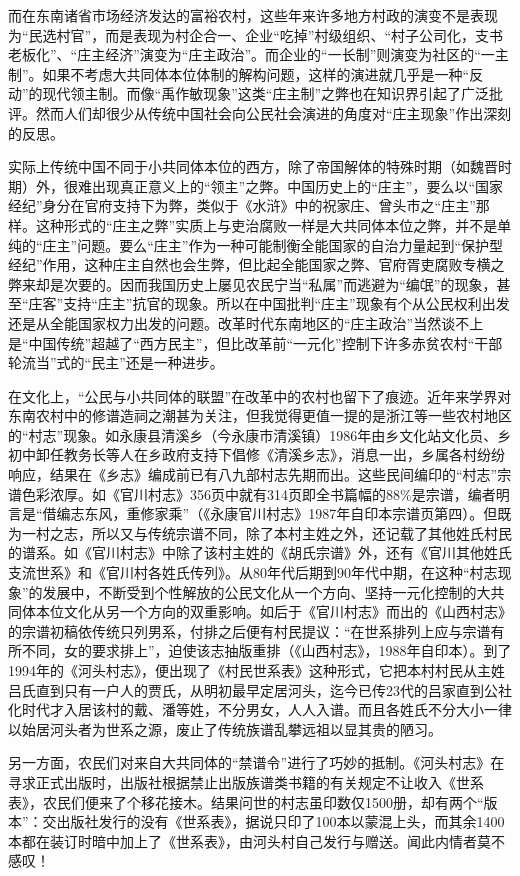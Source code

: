 \documentclass[a4paper,12pt,punct=kaiming,fontset=none]{ctexart}
\begin{document}
而在东南诸省市场经济发达的富裕农村，这些年来许多地方村政的演变不是表现为“民选村官”，而是表现为村企合一、企业“吃掉”村级组织、“村子公司化，支书老板化”、“庄主经济”演变为“庄主政治”。而企业的“一长制”则演变为社区的“一主制”。如果不考虑大共同体本位体制的解构问题，这样的演进就几乎是一种“反动”的现代领主制。而像“禹作敏现象”这类“庄主制”之弊也在知识界引起了广泛批评。然而人们却很少从传统中国社会向公民社会演进的角度对“庄主现象”作出深刻的反思。

实际上传统中国不同于小共同体本位的西方，除了帝国解体的特殊时期（如魏晋时期）外，很难出现真正意义上的“领主”之弊。中国历史上的“庄主”，要么以“国家经纪”身分在官府支持下为弊，类似于《水浒》中的祝家庄、曾头市之“庄主”那样。这种形式的“庄主之弊”实质上与吏治腐败一样是大共同体本位之弊，并不是单纯的“庄主”问题。要么“庄主”作为一种可能制衡全能国家的自治力量起到“保护型经纪”作用，这种庄主自然也会生弊，但比起全能国家之弊、官府胥吏腐败专横之弊来却是次要的。因而我国历史上屡见农民宁当“私属”而逃避为“编氓”的现象，甚至“庄客”支持“庄主”抗官的现象。所以在中国批判“庄主”现象有个从公民权利出发还是从全能国家权力出发的问题。改革时代东南地区的“庄主政治”当然谈不上是“中国传统”超越了“西方民主”，但比改革前“一元化”控制下许多赤贫农村“干部轮流当”式的“民主”还是一种进步。

在文化上，“公民与小共同体的联盟”在改革中的农村也留下了痕迹。近年来学界对东南农村中的修谱造祠之潮甚为关注，但我觉得更值一提的是浙江等一些农村地区的“村志”现象。如永康县清溪乡（今永康市清溪镇）1986年由乡文化站文化员、乡初中卸任教务长等人在乡政府支持下倡修《清溪乡志》，消息一出，乡属各村纷纷响应，结果在《乡志》编成前已有八九部村志先期而出。这些民间编印的“村志”宗谱色彩浓厚。如《官川村志》356页中就有314页即全书篇幅的88\%是宗谱，编者明言是“借编志东风，重修家乘”（《永康官川村志》1987年自印本宗谱页第四）。但既为一村之志，所以又与传统宗谱不同，除了本村主姓之外，还记载了其他姓氏村民的谱系。如《官川村志》中除了该村主姓的《胡氏宗谱》外，还有《官川其他姓氏支流世系》和《官川村各姓氏传列》。从80年代后期到90年代中期，在这种“村志现象”的发展中，不断受到个性解放的公民文化从一个方向、坚持一元化控制的大共同体本位文化从另一个方向的双重影响。如后于《官川村志》而出的《山西村志》的宗谱初稿依传统只列男系，付排之后便有村民提议：“在世系排列上应与宗谱有所不同，女的要求排上”，迫使该志抽版重排（《山西村志》，1988年自印本）。到了1994年的《河头村志》，便出现了《村民世系表》这种形式，它把本村村民从主姓吕氏直到只有一户人的贾氏，从明初最早定居河头，迄今已传23代的吕家直到公社化时代才入居该村的戴、潘等姓，不分男女，人人入谱。而且各姓氏不分大小一律以始居河头者为世系之源，废止了传统族谱乱攀远祖以显其贵的陋习。

另一方面，农民们对来自大共同体的“禁谱令”进行了巧妙的抵制。《河头村志》在寻求正式出版时，出版社根据禁止出版族谱类书籍的有关规定不让收入《世系表》，农民们便来了个移花接木。结果问世的村志虽印数仅1500册，却有两个“版本”：交出版社发行的没有《世系表》，据说只印了100本以蒙混上头，而其余1400本都在装订时暗中加上了《世系表》，由河头村自己发行与赠送。闻此内情者莫不感叹！
\end{document}
